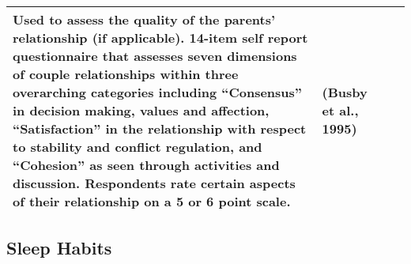 \documentclass[]{book}
\begin{document}
\begin{longtable}[]{@{}llll@{}}
\begin{minipage}[t]{0.22\columnwidth}
Used to assess the quality of the parents' relationship (if applicable). 14-item self report questionnaire that assesses seven dimensions of couple relationships within three overarching categories including ``Consensus'' in decision making, values and affection, ``Satisfaction'' in the relationship with respect to stability and conflict regulation, and ``Cohesion'' as seen through activities and discussion. Respondents rate certain aspects of their relationship on a 5 or 6 point scale.\strut
\end{minipage} & \begin{minipage}[t]{0.18\columnwidth}\raggedright
(Busby et al., 1995)\strut
\end{minipage}\tabularnewline
\bottomrule
\end{longtable}

\hypertarget{sleep-habits}{%
\subsection{Sleep Habits}\label{sleep-habits}}
\end{document}
